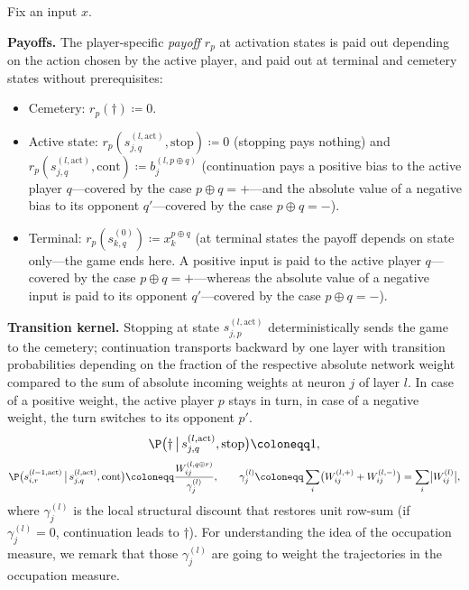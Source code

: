 \begin{definition}\label{ptnb:def:adf-recursion}
Fix an input $x$.

\textbf{Payoffs.} The player-specific \emph{payoff} $r_p$ at activation states is paid out
depending on the action chosen by the active player, and paid out at terminal and cemetery states
without prerequisites:
\begin{itemize}
    \item Cemetery: $r_p(\dagger) \coloneqq 0$.
    \item Active state: $r_p(s_{j,q}^{(l, \mathrm{act})}, \mathrm{stop}) \coloneqq 0$ (stopping pays nothing)
        and $r_p(s_{j,q}^{(l, \mathrm{act})}, \mathrm{cont}) \coloneqq b_j^{(l, p \oplus q)}$ (continuation
        pays a positive bias to the active player $q$---covered by the case $p \oplus q = +$---and the
        absolute value of a negative bias to its opponent $q'$---covered by the case $p \oplus q = -$).
    \item Terminal: $r_p(s_{k,q}^{(0)}) \coloneqq x_k^{p \oplus q}$ (at terminal states the payoff depends on
        state only---the game ends here. A positive input is paid to the active player $q$---covered by the
        case $p \oplus q = +$---whereas the absolute value of a negative input is paid to its opponent
        $q'$---covered by the case $p \oplus q = -$).
\end{itemize}

\textbf{Transition kernel.} Stopping at state $s^{(l, \text{act})}_{j,p}$ deterministically sends
the game to the cemetery; continuation transports backward by one layer with transition
probabilities depending on the fraction of the respective absolute network weight compared to the
sum of absolute incoming weights at neuron $j$ of layer $l$. In case of a positive weight, the
active player $p$ stays in turn, in case of a negative weight, the turn switches to its opponent
$p'$.
\begin{align}\label{ptnb:eq:adf-kernel-stop}
    \P\bigl(\dagger \,\big|\, s_{j,q}^{(l, \mathrm{act})}, \mathrm{stop}\bigr) \coloneqq 1,
\end{align}
\begin{align}\label{ptnb:eq:adf-kernel}
    \P\bigl(s_{i,r}^{(l-1, \mathrm{act})} \,\big|\, s_{j,q}^{(l, \mathrm{act})}, \mathrm{cont}\bigr)
    \coloneqq \frac{W_{ij}^{(l, q \oplus r)}}{\gamma_j^{(l)}},
    \qquad
    \gamma_j^{(l)} \coloneqq \sum_i \bigl(W_{ij}^{(l,+)} + W_{ij}^{(l,-)}\bigr) = \sum_i
    \bigl|W_{ij}^{(l)}\bigr|,
\end{align}
where $\gamma_j^{(l)}$ is the local structural discount that restores unit row-sum (if
$\gamma_j^{(l)} = 0$, continuation leads to $\dagger$). For understanding the idea of the
occupation measure, we remark that those $\gamma^{(l)}_j$ are going to weight the trajectories in
the occupation measure.


\end{definition}
